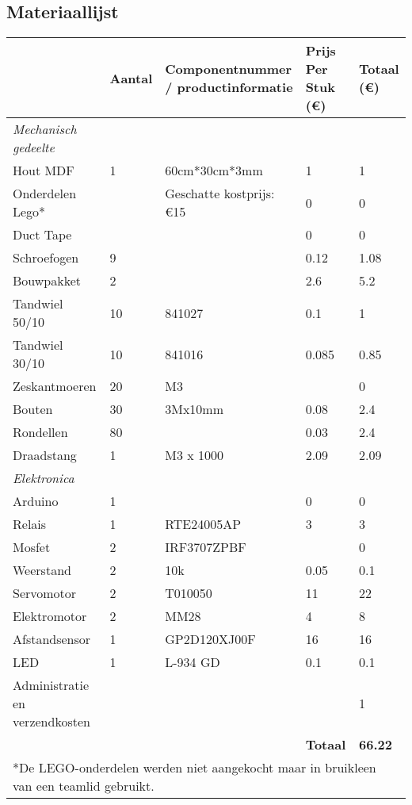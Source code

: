 \subsection{Materiaallijst}
\label{bijlage:materiaallijst}
\FloatBarrier
\begin{center}
\begin{table}
\begin{tabular}{| p{3cm} | l | p{3cm} | p{2cm} | p{2cm}|}
\hline
& \textbf{Aantal} & \textbf{Component\-nummer / product\-informatie} & 
\textbf{Prijs Per Stuk (\euro)} & \textbf{Totaal (\euro)}\\\hline
\emph{Mechanisch gedeelte} &  &  &  & \\\hline
Hout MDF & 1 & 60cm*30cm*3mm & 1 & 1\\\hline
Onderdelen Lego* &  & Geschatte kostprijs: \euro15 & 0 & 0\\\hline
Duct Tape &  &  & 0 & 0\\\hline
Schroefogen & 9 &  & 0.12 & 1.08\\\hline
Bouwpakket & 2 &  & 2.6 & 5.2\\\hline
Tandwiel 50/10 & 10 & 841027 & 0.1 & 1\\\hline
Tandwiel 30/10 & 10 & 841016 & 0.085 & 0.85\\\hline
Zeskantmoeren & 20 & M3 &  & 0\\\hline
Bouten & 30 & 3Mx10mm & 0.08 & 2.4\\\hline
Rondellen & 80 &  & 0.03 & 2.4\\\hline
Draadstang & 1 & M3 x 1000 & 2.09 & 2.09\\\hline
\emph{Elektronica} &  &  &  & \\\hline
Arduino & 1 &  & 0 & 0\\\hline
Relais & 1 & RTE24005AP & 3 & 3\\\hline
Mosfet & 2 & IRF3707ZPBF &  & 0\\\hline
Weerstand & 2 & 10k & 0.05 & 0.1\\\hline
Servomotor & 2 & T010050 & 11 & 22\\\hline
Elektromotor & 2 & MM28 & 4 & 8\\\hline
Afstandsensor & 1 & GP2D120XJ00F & 16 & 16\\\hline
LED & 1 & L-934 GD & 0.1 & 0.1\\\hline
Administratie en verzendkosten &  &  &  & 1\\\hline
 &  &  & \textbf{Totaal} & \textbf{66.22}\\\hline
 \multicolumn{5}{l}{*De LEGO-onderdelen werden niet aangekocht maar in bruikleen 
van een teamlid gebruikt.}\\
 

\end{tabular}
\end{table}
\end{center}
